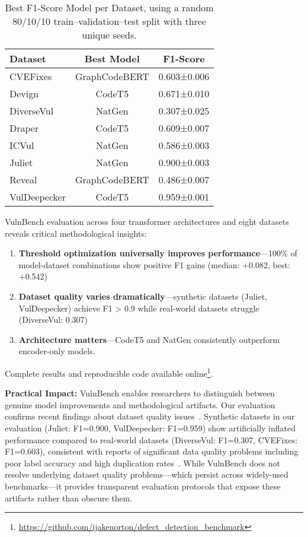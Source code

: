 \documentclass[letterpaper]{article}
\begin{document}
\begin{table}[ht]
	\centering
	\caption{Best F1-Score Model per Dataset, using a random 80/10/10 train–validation–test split with three unique seeds.}
	\label{tab:results}
	\begin{tabular}{lcc}
		\toprule
		Dataset      & Best Model    & F1-Score    \\
		\midrule
		CVEFixes     & GraphCodeBERT & 0.603±0.006 \\
		Devign       & CodeT5        & 0.671±0.010 \\
		DiverseVul   & NatGen        & 0.307±0.025 \\
		Draper       & CodeT5        & 0.609±0.007 \\
		ICVul        & NatGen        & 0.586±0.003 \\
		Juliet       & NatGen        & 0.900±0.003 \\
		Reveal       & GraphCodeBERT & 0.486±0.007 \\
		VulDeepecker & CodeT5        & 0.959±0.001 \\
		\bottomrule
	\end{tabular}
\end{table}

VulnBench evaluation across four transformer architectures and eight datasets reveals critical methodological insights:
\begin{enumerate}
	\item \textbf{Threshold optimization universally improves performance}---100\% of model-dataset combinations show positive F1 gains (median: +0.082, best: +0.542)
	\item \textbf{Dataset quality varies dramatically}---synthetic datasets (Juliet, VulDeepecker) achieve F1 > 0.9 while real-world datasets struggle (DiverseVul: 0.307)
	\item \textbf{Architecture matters}---CodeT5 and NatGen consistently outperform encoder-only models.
\end{enumerate}

Complete results and reproducible code available online\footnote{\url{https://github.com/ijakenorton/defect_detection_benchmark}}.

\textbf{Practical Impact:} VulnBench enables researchers to distinguish between genuine model improvements and methodological artifacts. Our evaluation confirms recent findings about dataset quality issues~\citep{ding2025vulnerability,chen2023diversevul}. Synthetic datasets in our evaluation (Juliet: F1=0.900, VulDeepecker: F1=0.959) show artificially inflated performance compared to real-world datasets (DiverseVul: F1=0.307, CVEFixes: F1=0.603), consistent with reports of significant data quality problems including poor label accuracy and high duplication rates~\cite{ding2025vulnerability}. While VulnBench does not resolve underlying dataset quality problems---which persist across widely-used benchmarks---it provides transparent evaluation protocols that expose these artifacts rather than obscure them.
\end{document}
